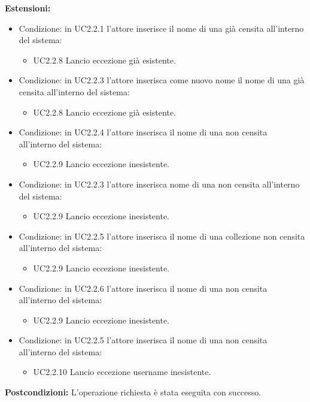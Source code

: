 \documentclass{scalatekids-article}
\begin{document}
\textbf{Estensioni:}
\begin{itemize}
\item Condizione: in UC2.2.1 l'attore inserisce il nome di una  già censita all'interno del sistema:
  \begin{itemize}
  \item UC2.2.8 Lancio eccezione  già esistente.
  \end{itemize}
\item Condizione: in UC2.2.3  l'attore inserisca come nuovo nome il nome di una  già censita all'interno del sistema:
  \begin{itemize}
  \item UC2.2.8 Lancio eccezione  già esistente.
  \end{itemize}
\item Condizione: in UC2.2.4 l'attore inserisca il nome di una  non censita all'interno del sistema:
  \begin{itemize}
  \item UC2.2.9 Lancio eccezione  inesistente.
  \end{itemize}
\item Condizione: in UC2.2.3 l'attore inserisca nome di una  non censita all'interno del sistema:
  \begin{itemize}
  \item UC2.2.9 Lancio eccezione  inesistente.
  \end{itemize}
\item Condizione: in UC2.2.5 l'attore inserisca il nome di una collezione non censita all'interno del sistema:
  \begin{itemize}
  \item UC2.2.9 Lancio eccezione  inesistente.
  \end{itemize}
\item Condizione: in UC2.2.6 l'attore inserisca il nome di una  non censita all'interno del sistema:
  \begin{itemize}
  \item UC2.2.9 Lancio eccezione  inesistente.
  \end{itemize}
\item Condizione: in UC2.2.5 l'attore inserisca il nome di una  non censita all'interno del sistema:
  \begin{itemize}
  \item UC2.2.10 Lancio eccezione username inesistente.
  \end{itemize}
\end{itemize}
\textbf{Postcondizioni:} L'operazione richiesta è stata eseguita con successo.
\end{document}
